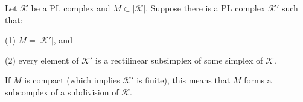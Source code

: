 Let $\mathcal{K}$ be a PL complex and $M \subset |\mathcal{K}|$. Suppose there is a PL complex $\mathcal{K}'$ such that:

(1) $M = |\mathcal{K}'|$, and

(2) every element of $\mathcal{K}'$ is a rectilinear subsimplex of some simplex of $\mathcal{K}$.

If $M$ is compact (which implies $\mathcal{K}'$ is finite), this means that $M$ forms a subcomplex of a subdivision of $\mathcal{K}$.
